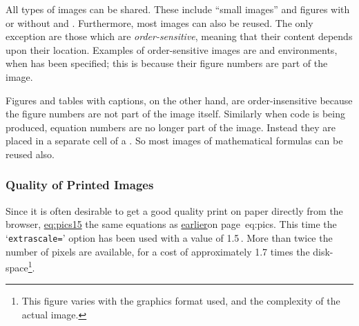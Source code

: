%
%
%
%
%
%
%
\html{\\}%
%
All types of images can be shared.  These include ``small images''
and figures with or without 
and .
Furthermore, most images can also be reused.  The only
exception are those which are \emph{order-sensitive},
meaning that their content depends upon their location.
Examples of order-sensitive images are  
and  environments, 
when  has been specified;
this is because their figure numbers are part of the image.

%
\html{\\}%

Figures and tables with captions, on the other hand, 
are order-insensitive because the figure numbers 
are not part of the image itself.%
Similarly when \HTMLiii{} code is being produced, equation
numbers are no longer part of the image.
Instead they are placed in a separate cell of a .
So most images of mathematical formulas can be reused also.%


\subsubsection{Quality of Printed Images\label{printqual}}
%
Since it is often desirable to get a good quality print on paper
directly from the browser, \hyperref{here are}{Figure~}{ shows}{eq:pics15} 
the same equations as \hyperref[page]{earlier}{on page~}{}{eq:pics}.
This time the `\texttt{extrascale=}' option has been used with a value of 1.5\,.
More than twice the number of pixels are available, 
for a cost of approximately 1.7 times the disk-space\footnote{This figure
varies with the graphics format used, and the complexity of the actual image.}.


